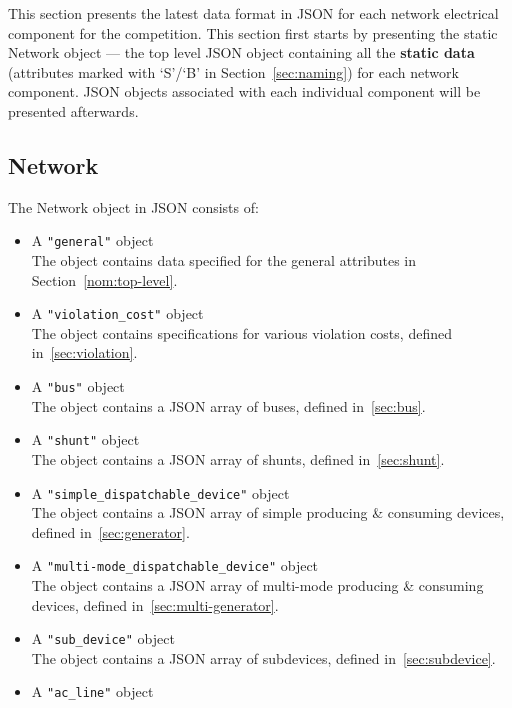 This section presents the latest data format in JSON for 
each network electrical component for the competition.
This section first starts by presenting the static Network object ---
the top level JSON object containing all the \textbf{static data}
(attributes marked with `S'/`B' in Section~\ref{sec:naming}) for each network component.
JSON objects associated with each individual component will be presented afterwards.

\subsection{Network}
\label{sec:network}
The Network object in JSON consists of: 
\begin{itemize}
    \item A \texttt{"general"} object\\
    The object contains data specified for the general attributes in Section~\ref{nom:top-level}.
    \item A \texttt{"violation\_cost"} object\\
    The object contains specifications for various violation costs, defined in~\ref{sec:violation}.
    \item A \texttt{"bus"} object\\
    The object contains a JSON array of buses, defined in~\ref{sec:bus}.
    \item A \texttt{"shunt"} object\\
    The object contains a JSON array of shunts, defined in~\ref{sec:shunt}.
    \item A \texttt{"simple\_dispatchable\_device"} object\\
    The object contains a JSON array of simple producing \& consuming devices, defined in~\ref{sec:generator}.
    \item A \texttt{"multi-mode\_dispatchable\_device"} object\\
    The object contains a JSON array of multi-mode producing \& consuming devices, defined in~\ref{sec:multi-generator}.
    \item A \texttt{"sub\_device"} object\\
    The object contains a JSON array of subdevices, defined in~\ref{sec:subdevice}.
    \item A \texttt{"ac\_line"} object\\

\end{itemize}
